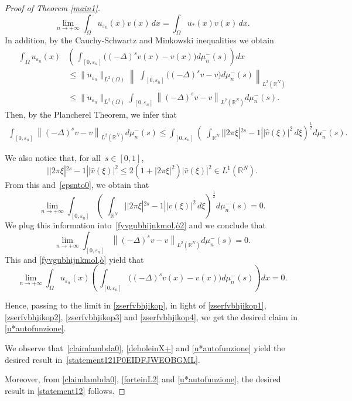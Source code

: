 \documentclass[12pt,a4paper,intlimits,sumlimits]{amsart}
\def \R {\mathbb{R}}
\theoremstyle{definition}
\theoremstyle{plain}
\numberwithin{equation}{section}
\renewcommand{\leq}{\leqslant}
\renewcommand{\le}{\leqslant}
\begin{document}
\begin{proof}[Proof of Theorem \ref{main1}]
\begin{equation}\label{zserfvbhjikop3}
\lim_{n\to +\infty}\int_{\Omega}u_{\varepsilon_n}(x)v(x)\,dx=
\int_{\Omega}u_*(x)v(x)\,dx.
\end{equation}
In addition, by the Cauchy-Schwartz and Minkowski inequalities we obtain
\begin{equation}\label{fyvgubhijnkmol,ò}
\begin{aligned}
\int_\Omega u_{\varepsilon_n}(x)&\left(\,\int_{[0, \varepsilon_n]}\Big((-\Delta)^s v(x)-v(x)\Big) d\mu^-_n(s)\right)dx \\
&\le \|u_{\varepsilon_n}\|_{L^2(\Omega)}\left\|\,\,\int_{[0, \varepsilon_n]}\Big((-\Delta)^s v-v\Big)d\mu^-_n(s) \right\|_{L^2(\R^N)}\\
&\le \|u_{\varepsilon_n}\|_{L^2(\Omega)}\int_{[0, \varepsilon_n]}\left\|(-\Delta)^s v-v \right\|_{L^2(\R^N)}d\mu^-_n(s).
\end{aligned}
\end{equation}
Then, by the Plancherel Theorem, we infer that
\begin{equation}\label{fyvgubhijnkmol,ò2}
\begin{aligned}
\int_{[0, \varepsilon_n]}\left\|(-\Delta)^s v-v \right\|_{L^2(\R^N)}d\mu^-_n(s)
\le \int_{[0, \varepsilon_n]} \left(\,\,\int_{\R^N}||2\pi\xi|^{2s}-1||\widehat{v}(\xi)|^2\,d\xi\right)^\frac{1}{2}d\mu^-_n(s) .
\end{aligned}
\end{equation}

We also notice that, for all~$s\in[0,1]$,
\[
||2\pi\xi|^{2s}-1||\widehat{v}(\xi)|^2\leq 2(1+|2\pi\xi|^2) |\widehat{v}(\xi)|^2\in L^1(\R^N).
\]
From this and~\eqref{epsnto0}, we obtain that
$$ \lim_{n\to +\infty}\int_{[0, \varepsilon_n]} \left(\,\,\int_{\R^N}||2\pi\xi|^{2s}-1||\widehat{v}(\xi)|^2\,d\xi\right)^\frac{1}{2}d\mu^-_n(s)=0.$$
We plug this information into~\eqref{fyvgubhijnkmol,ò2} and we conclude that
$$ \lim_{n\to +\infty}
\int_{[0, \varepsilon_n]}\left\|(-\Delta)^s v-v \right\|_{L^2(\R^N)}d\mu^-_n(s)=0.$$
This and \eqref{fyvgubhijnkmol,ò} yield that
\begin{equation}\label{zserfvbhjikop4}
\lim_{n\to +\infty}\int_\Omega u_{\varepsilon_n}(x)\left(\,\int_{[0, \varepsilon_n]}\Big((-\Delta)^s v(x)-v(x)\Big) d\mu^-_n(s)\right)dx=0.
\end{equation}

Hence,  passing to the limit in \eqref{zserfvbhjikop}, in light of  \eqref{zserfvbhjikop1}, \eqref{zserfvbhjikop2}, \eqref{zserfvbhjikop3} and \eqref{zserfvbhjikop4}, we get the desired claim in \eqref{u*autofunzione}. 

We observe that~\eqref{claimlambda0}, \eqref{deboleinX+} and \eqref{u*autofunzione} yield the desired result in~\eqref{statement121P0EIDFJWEOBGML}.

Moreover, from \eqref{claimlambda0}, \eqref{forteinL2} and \eqref{u*autofunzione}, the desired result in \eqref{statement12} follows.
\end{proof}
\end{document}
